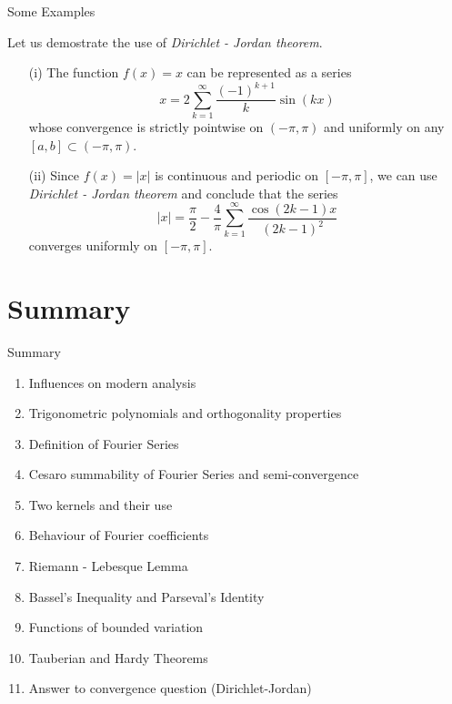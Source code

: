 \documentclass{beamer}
\begin{document}
\begin{frame}{Some Examples}

\begin{example}
    Let us demostrate the use of \emph{Dirichlet - Jordan theorem}.
    \begin{itemize}
        \item[(i)] The function $f(x) = x$ can be represented as a series
        \[
        x = 2\sum_{k=1}^{\infty}\frac{(-1)^{k+1}}{k}\sin(kx)
        \]
        whose convergence is strictly pointwise on $(-\pi,\pi)$ and uniformly on any $[a,b] \subset (-\pi,\pi)$.
        \item[(ii)] Since $f(x) = |x|$ is continuous and periodic on $[-\pi,\pi]$, we can use \emph{Dirichlet - Jordan theorem} and conclude that the series
        \[
        |x| = \frac{\pi}{2} - \frac{4}{\pi} \sum_{k=1}^{\infty}\frac{\cos(2k-1)x}{(2k-1)^2}
        \]
        converges uniformly on $[-\pi,\pi]$.
    \end{itemize}
\end{example}
    
\end{frame}



\section{Summary}
\begin{frame}{Summary}
    \small
    \begin{enumerate}
        \item Influences on modern analysis
        \item Trigonometric polynomials and orthogonality properties
        \item Definition of Fourier Series
        \item Cesaro summability of Fourier Series and semi-convergence
        \item Two kernels and their use
        \item Behaviour of Fourier coefficients
        \item Riemann - Lebesque Lemma
        \item Bassel's Inequality and Parseval's Identity 
        \item Functions of bounded variation
        \item Tauberian and Hardy Theorems
        \item Answer to convergence question (Dirichlet-Jordan)
    \end{enumerate}
\end{frame}
\end{document}
